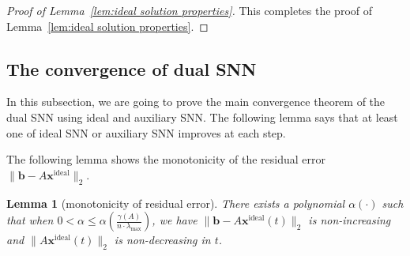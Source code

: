 \documentclass[11pt]{article}
\newtheorem{lemma}{Lemma}[section]
\theoremstyle{remark}
\theoremstyle{definition}
\newcommand{\bx}{\mathbf{x}}
\newcommand{\bb}{\mathbf{b}}
\begin{document}
\begin{proof}[Proof of Lemma~\ref{lem:ideal solution properties}]
	This completes the proof of Lemma~\ref{lem:ideal solution properties}.
\end{proof}


\subsection{The convergence of dual SNN}\label{sec:l1 convergence}
In this subsection, we are going to prove the main convergence theorem of the dual SNN using ideal and auxiliary SNN. The following lemma says that at least one of ideal SNN or auxiliary SNN improves at each step.

The following lemma shows the monotonicity of the residual error $\|\bb-A\bx^{\text{ideal}}\|_2$.
\begin{lemma}[monotonicity of residual error]\label{lemma:idealalgorithm-primal-nondecreasing}
	There exists a polynomial $\alpha(\cdot)$ such that when $0<\alpha\leq \alpha(\frac{\gamma(A)}{n\cdot\lambda_{\max}})$, we have $\|\bb-A\bx^{\text{ideal}}(t)\|_2$ is non-increasing and $\|A\bx^{\text{ideal}}(t)\|_2$ is non-decreasing in $t$.
\end{lemma}
\end{document}
